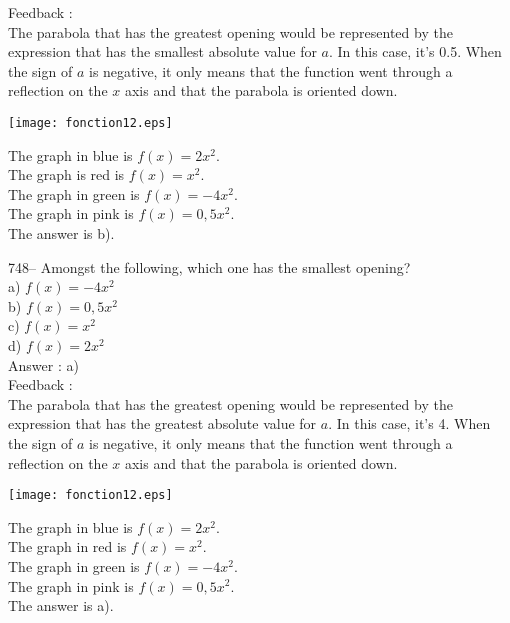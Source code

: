 \documentclass[letterpaper, 12pt]{article}
\begin{document}
Feedback : \\
The parabola that has the greatest opening would be represented by the expression that has the smallest absolute value for $a$.
In this case, it's 0.5. When the sign of $a$ is negative, it only means that the function went through a reflection on the $x$ axis and that the parabola is oriented down.\\
    \begin{center}
    \texttt{[image: fonction12.eps]}
    \end{center}
The graph in blue is $f(x)=2x^{2}$.\\
The graph is red is $f(x)=x^{2}$.\\
The graph in green is $f(x)=-4x^{2}$.\\
The graph in pink is $f(x)=0,5x^{2}$.\\
The answer is b). 


748-- Amongst the following, which one has the smallest opening?\\
a) $f(x)=-4x^{2}$\\
b) $f(x)=0,5x^{2}$\\
c) $f(x)=x^{2}$\\
d) $f(x)=2x^{2}$\\

Answer : a)\\

Feedback : \\
The parabola that has the greatest opening would be represented by the expression that has the greatest absolute value for $a$.
In this case, it's 4. When the sign of $a$ is negative, it only means that the function went through a reflection on the $x$ axis and that the parabola is oriented down.\\
    \begin{center}
    \texttt{[image: fonction12.eps]}
    \end{center}


The graph in blue is $f(x)=2x^{2}$.\\
The graph in red is $f(x)=x^{2}$.\\
The graph in green is $f(x)=-4x^{2}$.\\
The graph in pink is $f(x)=0,5x^{2}$.\\
The answer is a).\\
\end{document}
